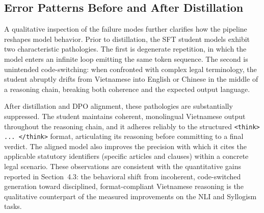 \subsection{Error Patterns Before and After Distillation}

A qualitative inspection of the failure modes further clarifies how the pipeline reshapes model behavior. Prior to distillation, the SFT student models exhibit two characteristic pathologies. The first is degenerate repetition, in which the model enters an infinite loop emitting the same token sequence. The second is unintended code-switching: when confronted with complex legal terminology, the student abruptly drifts from Vietnamese into English or Chinese in the middle of a reasoning chain, breaking both coherence and the expected output language.

After distillation and DPO alignment, these pathologies are substantially suppressed. The student maintains coherent, monolingual Vietnamese output throughout the reasoning chain, and it adheres reliably to the structured \texttt{<think> ... </think>} format, articulating its reasoning before committing to a final verdict. The aligned model also improves the precision with which it cites the applicable statutory identifiers (specific articles and clauses) within a concrete legal scenario. These observations are consistent with the quantitative gains reported in Section~4.3: the behavioral shift from incoherent, code-switched generation toward disciplined, format-compliant Vietnamese reasoning is the qualitative counterpart of the measured improvements on the NLI and Syllogism tasks.
